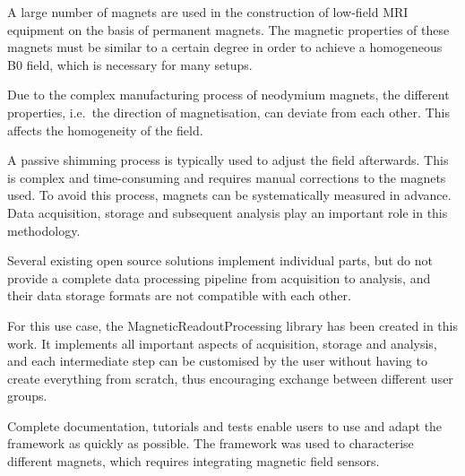 A large number of magnets are used in the construction of low-field MRI
equipment on the basis of permanent magnets. The magnetic properties of
these magnets must be similar to a certain degree in order to achieve a
homogeneous B0 field, which is necessary for many setups.

Due to the complex manufacturing process of neodymium magnets, the
different properties, i.e.~the direction of magnetisation, can deviate
from each other. This affects the homogeneity of the field.

A passive shimming process is typically used to adjust the field
afterwards. This is complex and time-consuming and requires manual
corrections to the magnets used. To avoid this process, magnets can be
systematically measured in advance. Data acquisition, storage and
subsequent analysis play an important role in this methodology.

Several existing open source solutions implement individual parts, but
do not provide a complete data processing pipeline from acquisition to
analysis, and their data storage formats are not compatible with each
other.

For this use case, the MagneticReadoutProcessing library has been
created in this work. It implements all important aspects of
acquisition, storage and analysis, and each intermediate step can be
customised by the user without having to create everything from scratch,
thus encouraging exchange between different user groups.

Complete documentation, tutorials and tests enable users to use and
adapt the framework as quickly as possible. The framework was used to
characterise different magnets, which requires integrating magnetic
field sensors.
